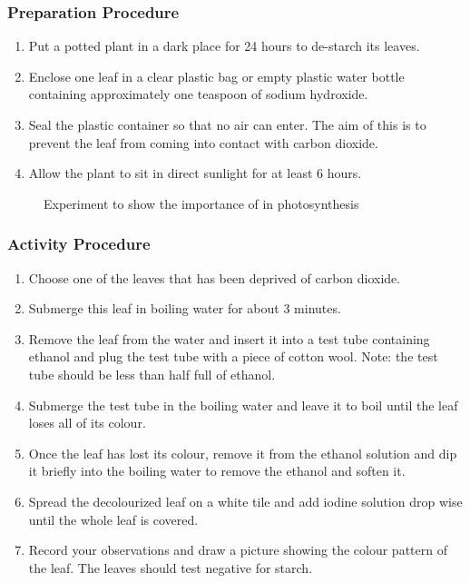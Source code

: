 \subsubsection*{Preparation Procedure}
\begin{enumerate}
\item{Put a potted plant in a dark place for 24 hours to de-starch its leaves.}
\item{Enclose one leaf in a clear plastic bag or empty plastic water bottle containing approximately one teaspoon of sodium hydroxide.}
\item{Seal the plastic container so that no air can enter. The aim of this is to prevent the leaf from coming into contact with carbon dioxide.}
\item{Allow the plant to sit in direct sunlight for at least 6 hours.}
\end{enumerate}

\begin{figure}[h]
\begin{center}
\def\svgwidth{3cm}

\caption{Experiment to show the importance of  in photosynthesis}
\label{fig:CO2-photosynth}
\end{center}
\end{figure}
\subsubsection*{Activity Procedure}

\begin{enumerate}
\item{Choose one of the leaves that has been deprived of carbon dioxide.}
\item{Submerge this leaf in boiling water for about 3 minutes.}
\item{Remove the leaf from the water and insert it into a test tube containing ethanol and plug the test tube with a piece of cotton wool. Note: the test tube should be less than half full of ethanol.}
\item{Submerge the test tube in the boiling water and leave it to boil until the leaf loses all of its colour.}
\item{Once the leaf has lost its colour, remove it from the ethanol solution and dip it briefly into the boiling water to remove the ethanol and soften it.}
\item{Spread the decolourized leaf on a white tile and add iodine solution drop wise until the whole leaf is covered. }
\item{Record your observations and draw a picture showing the colour pattern of the leaf. The leaves should test negative for starch.}
\end{enumerate}

